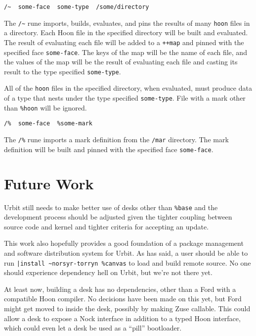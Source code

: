 \documentclass[twoside]{article}
\begin{document}
\begin{lstlisting}[style=listingcode]
  /~  some-face  some-type  /some/directory
\end{lstlisting}

The \lstinline[style=inlinecode]{/~} rune imports, builds, evaluates, and pins the results of many \lstinline[style=inlinecode]{hoon} files in a directory.  Each Hoon file in the specified directory will be built and evaluated. The result of evaluating each file will be added to a \lstinline[style=inlinecode]{++map} and pinned with the specified face \lstinline[style=inlinecode]{some-face}. The keys of the map will be the name of each file, and the values of the map will be the result of evaluating each file and casting its result to the type specified \lstinline[style=inlinecode]{some-type}.

All of the \lstinline[style=inlinecode]{hoon} files in the specified directory, when evaluated, must produce data of a type that nests under the type specified \lstinline[style=inlinecode]{some-type}. File with a mark other than \lstinline[style=inlinecode]{%hoon} will be ignored.

\begin{lstlisting}[style=listingcode]
  /%  some-face  %some-mark
\end{lstlisting}

The \lstinline[style=inlinecode]{/%} rune imports a mark definition from the \lstinline[style=inlinecode]{/mar} directory.  The mark definition will be built and pinned with the specified face \lstinline[style=inlinecode]{some-face}.


\section{Future Work}

Urbit still needs to make better use of desks other than \lstinline[style=inlinecode]{%base} and the development process should be adjusted given the tighter coupling between source code and kernel and tighter criteria for accepting an update.

This work also hopefully provides a good foundation of a package management and software distribution system for Urbit. As  has said, a user should be able to run \lstinline[style=inlinecode]{|install ~norsyr-torryn %canvas} to load and build remote source. No one should experience dependency hell on Urbit, but we're not there yet.

At least now, building a desk has no dependencies, other than a Ford with a compatible Hoon compiler. No decisions have been made on this yet, but Ford might get moved to inside the desk, possibly by making Zuse callable. This could allow a desk to expose a Nock interface in addition to a typed Hoon interface, which could even let a desk be used as a ``pill'' bootloader.
\end{document}
